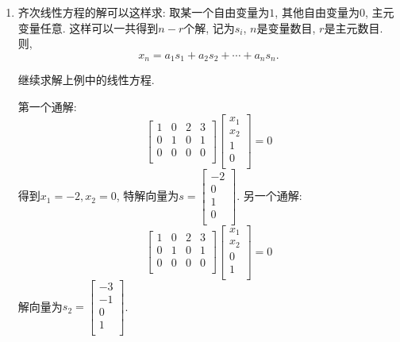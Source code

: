 \begin{itemize}
\begin{enumerate}
        \item 齐次线性方程的解可以这样求:
        取某一个自由变量为$1$, 其他自由变量为$0$, 主元变量任意. 这样可以一共得到$n-r$个解, 记为$s_i$, $n$是变量数目, $r$是主元数目.
        则, 
        \begin{equation}
          x_n = a_1 s_1 +a_2s_2+ \cdots +a_n s_n.
        \end{equation}
        \begin{example}
            继续求解上例中的线性方程.
        
            第一个通解:
            \begin{equation}
              \begin{bmatrix}
               1 & 0 & 2 & 3\\
               0 & 1 & 0 & 1\\
               0 & 0 & 0 & 0\\
              \end{bmatrix}
              \begin{bmatrix}
               x_1\\
               x_2\\
               1\\
               0\\
              \end{bmatrix} = 0
            \end{equation}
            得到$x_1=-2, x_2=0$, 特解向量为$s = \begin{bmatrix}
             -2\\
             0\\
             1\\
             0\\
            \end{bmatrix}$.
            另一个通解:
            \begin{equation}
              \begin{bmatrix}
               1 & 0 & 2 & 3\\
               0 & 1 & 0 & 1\\
               0 & 0 & 0 & 0\\
              \end{bmatrix}
              \begin{bmatrix}
               x_1\\
               x_2\\
               0\\
               1\\
              \end{bmatrix}=0
            \end{equation}
            解向量为$s_2 = \begin{bmatrix}
             -3\\
             -1\\
             0\\
             1\\
            \end{bmatrix}$.
        

\end{example}
\end{enumerate}
\end{itemize}
